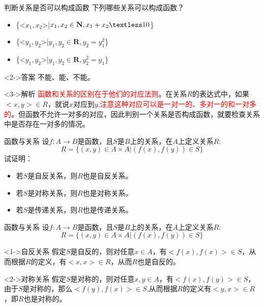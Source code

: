 \documentclass[xetex,10pt,aspectratio=43]{beamer}
\begin{document}
\begin{frame}{判断关系是否可以构成函数}
	下列哪些关系可以构成函数？
	\begin{itemize}
		\item<0-> \{<$x_{1},x_{2}$>|$x_{1},x_{2}\in \mathbf{N},x_{1}+x_{2}\textless 10$\}
		\item<0-> \{<$y_{1},y_{2}$>|$y_{1},y_{2}\in \mathbf{R},y_{2}=y_{1}^{2}$\}
		\item<0-> \{<$y_{1},y_{2}$>|$y_{1},y_{2}\in \mathbf{R},y_{2}^{2}=y_{1}$\}
	\end{itemize}

	\begin{block}<2->{答案}
		不能、能、不能。
	\end{block}

	\begin{block}<3->{解析}
		\textcolor{red}{函数和关系的区别在于他们的对应法则}。在关系$R$的表达式中，如果$<x,y>\in R$，就说$x$对应到$y$,\textcolor{red}{注意这种对应可以是一对一的、多对一的和一对多的}。但函数不允许一对多的对应，因此判别一个关系是否构成函数，就要检查关系中是否存在一对多的情况。
	\end{block}
\end{frame}

\begin{frame}{函数与关系}
	设$f:A\rightarrow B$是函数，且$S$是$B$上的关系，在$A$上定义关系$R$:$$R=\{(x,y)\in A\times A|(f(x),f(y))\in S\}$$
	试证明：
	\begin{itemize}
		\item<0-> 若$S$是自反关系，则$R$也是自反关系。
		\item<0-> 若$S$是对称关系，则$R$也是对称关系。
		\item<0-> 若$S$是传递关系，则$R$也是传递关系。
	\end{itemize}
\end{frame}

\begin{frame}{函数与关系}
	设$f:A\rightarrow B$是函数，且$S$是$B$上的关系，在$A$上定义关系$R$:$$R=\{(x,y)\in A\times A|(f(x),f(y))\in S\}$$
	
	\begin{block}<1->{自反关系}
		假定$S$是自反的，则对任意$x\in A$，有$<f(x),f(x)>\in S$，从而根据$R$的定义，有$<x,x>\in R$，从而$R$也是自反的。
	\end{block}
	
	\begin{block}<2->{对称关系}
		假定$S$是对称的，则对任意$x,y\in A$，有$<f(x),f(y)>\in S$，由于$S$是对称的，那么$<f(y),f(x)>\in S$,从而根据$R$的定义有$<y,x>\in R$，即$R$也是对称的。
	\end{block}
	
\end{frame}
\end{document}
